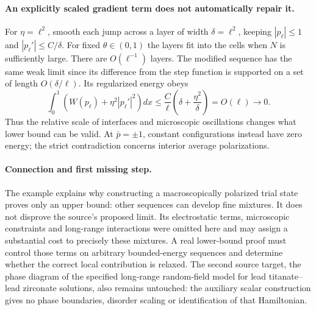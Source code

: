 \documentclass[11pt]{article}
\begin{document}
\paragraph{An explicitly scaled gradient term does not automatically repair it.}
For $\eta=\ell^2$, smooth each jump across a layer of width $\delta=\ell^2$, keeping $|p_\ell|\leq1$ and $|p_\ell'|\leq C/\delta$. For fixed $\theta\in(0,1)$ the layers fit into the cells when $N$ is sufficiently large. There are $O(\ell^{-1})$ layers. The modified sequence has the same weak limit since its difference from the step function is supported on a set of length $O(\delta/\ell)$. Its regularized energy obeys
\[
 \int_0^1\left(W(p_\ell)+\eta^2|p_\ell'|^2\right)dx
 \leq\frac C\ell\left(\delta+\frac{\eta^2}{\delta}\right)
 =O(\ell)\longrightarrow0.
\]
Thus the relative scale of interfaces and microscopic oscillations changes what lower bound can be valid. At $\bar p=\pm1$, constant configurations instead have zero energy; the strict contradiction concerns interior average polarizations.

\paragraph{Connection and first missing step.}
The example explains why constructing a macroscopically polarized trial state proves only an upper bound: other sequences can develop fine mixtures. It does not disprove the source's proposed limit. Its electrostatic terms, microscopic constraints and long-range interactions were omitted here and may assign a substantial cost to precisely these mixtures. A real lower-bound proof must control those terms on arbitrary bounded-energy sequences and determine whether the correct local contribution is relaxed. The second source target, the phase diagram of the specified long-range random-field model for lead titanate--lead zirconate solutions, also remains untouched: the auxiliary scalar construction gives no phase boundaries, disorder scaling or identification of that Hamiltonian.
\end{document}

